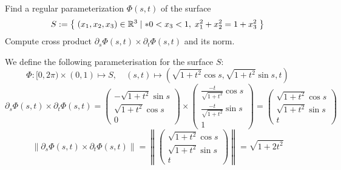 \documentclass[11pt]{article}
\begin{document}
\begin{exercise}
    Find a regular parameterization $\Phi(s,t)$ of the surface 
    \begin{gather*}
        S := \left\{\; (x_1,x_2,x_3) \in \mathbb R^3 \suchthat* 0 < x_3 < 1, \; x_1^2 + x_2^2 = 1 + x_3^2 \;\right\}
    \end{gather*}
    Compute cross product $\partial_s \Phi(s,t) \times \partial_t \Phi(s,t)$ and its norm. 
\end{exercise}
\begin{solution}     
    We define the following parameterisation for the surface $S$:
    \[
        \Phi: [0,2\pi) \times (0,1) \mapsto S,
        \quad 
        (s,t) \mapsto \left( \sqrt{1+t^{2}}\cos s, \sqrt{1+t^{2}}\sin s, t \right)
    \]
    \[
        \partial_s \Phi(s,t) \times \partial_t \Phi(s,t) 
        = 
        \begin{pmatrix} 
            -\sqrt{1+t^2}\sin s
            \\ 
            \sqrt{1+t^2}\cos s
            \\
            0 
        \end{pmatrix} 
        \times 
        \begin{pmatrix} 
            \frac{- t}{\sqrt{1+t^2}}\cos s 
            \\ 
            \frac{- t}{\sqrt{1+t^2}}\sin s 
            \\
            1 
        \end{pmatrix} 
        = 
        \begin{pmatrix} 
            \sqrt{1+t^2}\cos s 
            \\ 
            \sqrt{1+t^2}\sin s
            \\ 
            t
        \end{pmatrix} 
    \]
    \[
        \left\|
        \partial_s \Phi(s,t) \times \partial_t \Phi(s,t)
        \right\| 
        = 
        \left\| 
        \begin{pmatrix} 
            \sqrt{1+t^2}\cos s 
            \\ 
            \sqrt{1+t^2}\sin s
            \\ 
            t
        \end{pmatrix} \right\| 
        = 
        \sqrt{1+2t^2}
    \]
\end{solution}
\end{document}
